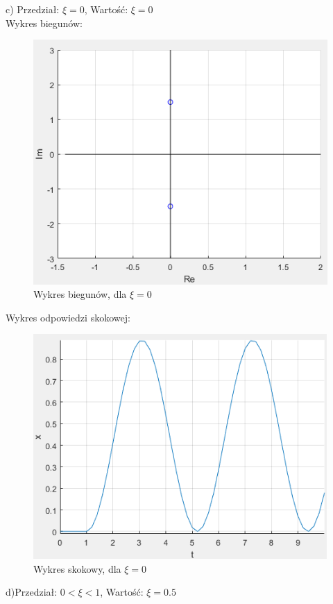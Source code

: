\documentclass{article}
\begin{document}
\begin{flushleft}
 \newpage
 c) Przedział: $\xi=0$, Wartość: $\xi=0$\\
 
 
 Wykres biegunów:\\
 \begin{figure}[h!]
    \centering
    \includegraphics[scale=0.6]{biegunyksi0png.png}
    \caption{Wykres biegunów, dla $\xi=0$}
    \label{fig:bieguny_ksi_0}
 \end{figure}
 
 
 Wykres odpowiedzi skokowej:\\
 \begin{figure}[h!]
     \centering
    \includegraphics[scale=0.6]{skokksi0.png}
     \caption{Wykres skokowy, dla $\xi=0$}
     \label{fig:ksi_0}
 \end{figure}
 \newpage
 d)Przedział: $0<\xi<1$, Wartość: $\xi=0.5$\\
 

\end{flushleft}
\end{document}
